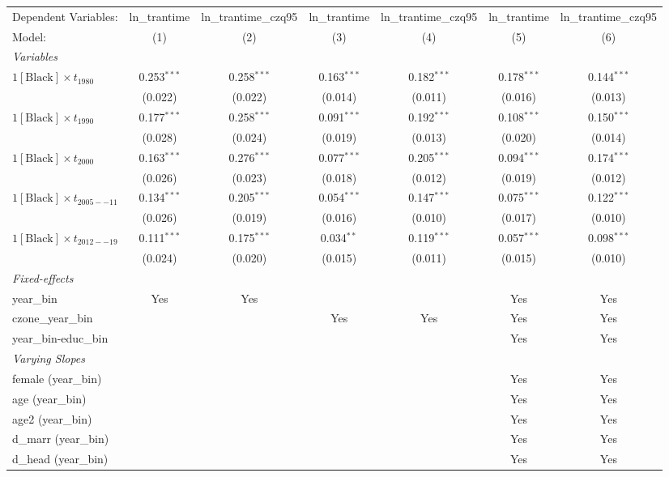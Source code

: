 \begin{tabular}{lcccccc}
\tabularnewline\midrule\midrule
Dependent Variables:&ln\_trantime&ln\_trantime\_czq95&ln\_trantime&ln\_trantime\_czq95&ln\_trantime&ln\_trantime\_czq95\\
Model:&(1) & (2) & (3) & (4) & (5) & (6)\\
\midrule \emph{Variables}&   &   &   &   &   &  \\
$1[\text{Black}] \times t_{1980}$ & 0.253$^{***}$ & 0.258$^{***}$ & 0.163$^{***}$ & 0.182$^{***}$ & 0.178$^{***}$ & 0.144$^{***}$\\
  &(0.022) & (0.022) & (0.014) & (0.011) & (0.016) & (0.013)\\
$1[\text{Black}] \times t_{1990}$ & 0.177$^{***}$ & 0.258$^{***}$ & 0.091$^{***}$ & 0.192$^{***}$ & 0.108$^{***}$ & 0.150$^{***}$\\
  &(0.028) & (0.024) & (0.019) & (0.013) & (0.020) & (0.014)\\
$1[\text{Black}] \times t_{2000}$ & 0.163$^{***}$ & 0.276$^{***}$ & 0.077$^{***}$ & 0.205$^{***}$ & 0.094$^{***}$ & 0.174$^{***}$\\
  &(0.026) & (0.023) & (0.018) & (0.012) & (0.019) & (0.012)\\
$1[\text{Black}] \times t_{2005--11}$ & 0.134$^{***}$ & 0.205$^{***}$ & 0.054$^{***}$ & 0.147$^{***}$ & 0.075$^{***}$ & 0.122$^{***}$\\
  &(0.026) & (0.019) & (0.016) & (0.010) & (0.017) & (0.010)\\
$1[\text{Black}] \times t_{2012--19}$ & 0.111$^{***}$ & 0.175$^{***}$ & 0.034$^{**}$ & 0.119$^{***}$ & 0.057$^{***}$ & 0.098$^{***}$\\
  &(0.024) & (0.020) & (0.015) & (0.011) & (0.015) & (0.010)\\
\midrule \emph{Fixed-effects}&   &   &   &   &   &  \\
year\_bin & Yes & Yes &  &  & Yes & Yes\\
czone\_year\_bin &  &  & Yes & Yes & Yes & Yes\\
year\_bin-educ\_bin &  &  &  &  & Yes & Yes\\
\midrule \emph{Varying Slopes}&   &   &   &   &   &  \\
female (year\_bin) &  &  &  &  & Yes & Yes\\
age (year\_bin) &  &  &  &  & Yes & Yes\\
age2 (year\_bin) &  &  &  &  & Yes & Yes\\
d\_marr (year\_bin) &  &  &  &  & Yes & Yes\\
d\_head (year\_bin) &  &  &  &  & Yes & Yes\\

\end{tabular}
